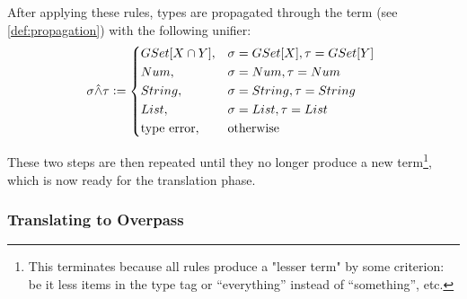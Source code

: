 \documentclass[main.tex]{subfiles}
\begin{document}
After applying these rules, types are propagated through the term
(see \cref{def:propagation}) with the following unifier:
\[
    \sigma \unify \tau \defeq
    \begin{cases*}
        GSet[X \cap Y] ,& $\sigma = GSet[X], \tau = GSet[Y]$ \\
        Num ,& $\sigma = Num, \tau = Num$ \\
        String ,& $\sigma = String, \tau = String$ \\
        List ,& $\sigma = List, \tau = List$ \\
        \text{type error} ,& otherwise \\
    \end{cases*}
\]

These two steps are then repeated until they no longer produce a new term\footnote{
    This terminates because all rules produce a "lesser term" by some criterion:
    be it less items in the type tag or ``everything'' instead of ``something'', etc.
}, which is now ready for the translation phase.


\subsubsection{Translating to Overpass}\label{sec:translation}
\end{document}

